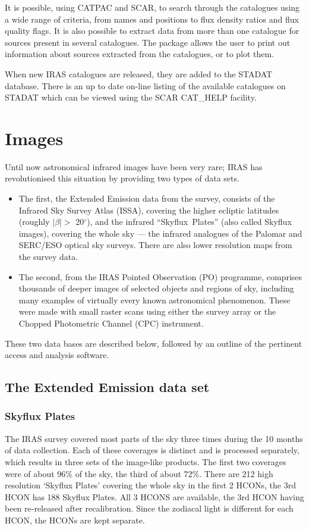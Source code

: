 It is possible, using CATPAC and SCAR, to search through the catalogues using
a wide range of criteria, from names and positions to flux density ratios and
flux quality flags.
It is also possible to extract data from more than one catalogue for sources
present in several catalogues.
The package allows the user to print out information about sources extracted
from the catalogues, or to plot them.

When new IRAS catalogues are released, they are added to the STADAT
database.
There is an up to date on-line listing of the available catalogues on STADAT
which can be viewed using the SCAR CAT\_HELP facility.

\section{Images}
\label{m:images}
Until now astronomical infrared images have been very rare; IRAS has
revolutionised this situation by providing two types of data sets.
\begin{itemize}
\item The first, the Extended Emission data from the survey, consists of
the Infrared Sky Survey Atlas (ISSA), covering the higher ecliptic latitudes
(roughly $| \beta | >$ 20$^{\circ}$), and the infrared ``Skyflux~Plates''
(also called Skyflux images), covering the whole sky --- the infrared analogues
of the Palomar and SERC/ESO optical sky surveys.
There are also lower resolution maps from the survey data.
\item The second, from the IRAS Pointed Observation (PO) programme,
comprises thousands of deeper images of selected objects and regions of sky,
including many examples of virtually every known astronomical phenomenon.
These were made with small raster scans using either the survey array or the
Chopped Photometric Channel (CPC) instrument.
\end{itemize}
These two data bases are described below, followed by an outline of the
pertinent access and analysis software.

\subsection{The Extended Emission data set}

\subsubsection{Skyflux Plates}
The IRAS survey covered most parts of the sky three times during the 10 months
of data collection. Each of these coverages is distinct and is processed
separately, which results in three sets of the image-like products. The first
two coverages were of about 96\% of the sky, the third of about 72\%.
There are 212 high resolution `Skyflux Plates' covering the whole sky in the
first 2 HCONs, the 3rd HCON has 188 Skyflux Plates. All 3 HCONS are available,
the 3rd HCON having been re-released after recalibration.
Since the zodiacal light is different for each HCON, the HCONs are kept
separate.

